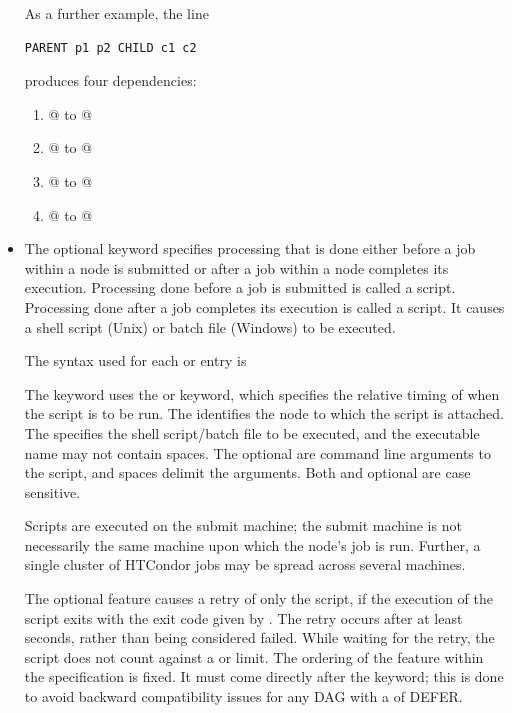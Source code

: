 \begin{itemize}
As a further example, the line
\begin{verbatim}
PARENT p1 p2 CHILD c1 c2
\end{verbatim}
produces four dependencies:
\begin{enumerate}
\item{@ to @}
\item{@ to @}
\item{@ to @}
\item{@ to @}
\end{enumerate}

\label{dagman:SCRIPT}
\item {}

The optional  keyword specifies
processing that is done either before a job within
a node is submitted
or after a job within a node completes its execution.
Processing done before a job is submitted is
called a  script.
Processing done after a job completes its execution is
called a  script.
It causes a shell script (Unix) or batch file (Windows) to be
executed.

The syntax used for each  or  entry is

 
   

 
    

The  keyword uses
the  or  keyword,
which specifies the relative timing of when the script is to be run.
The  identifies the node to which the script is attached.
The 
specifies the shell script/batch file to be executed, 
and the executable name may not contain spaces.
The optional  are command line arguments to the script,
and spaces delimit the arguments.
Both  and optional  are
case sensitive.

Scripts are executed on the submit machine;
the submit machine is not necessarily
the same machine upon which the node's job is run.
Further, a single cluster of HTCondor jobs may be
spread across several machines.

The optional  feature causes a retry of only the script,
if the execution of the script exits with the
exit code given by .
The retry occurs after at least  seconds, 
rather than being considered failed.  
While waiting for the retry,
the script does not count against a  or  limit.
The ordering of the  feature within the  
specification is fixed.
It must come directly after the  keyword;
this is done to avoid backward compatibility issues for any
DAG with a  of DEFER.


\end{itemize}
